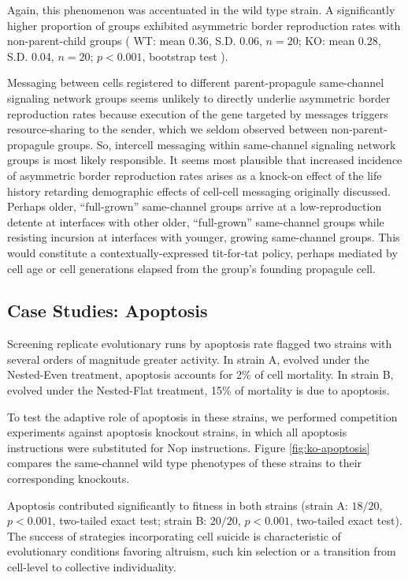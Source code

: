 Again, this phenomenon was accentuated in the wild type strain.
A significantly higher proportion of groups exhibited asymmetric border reproduction rates with non-parent-child groups
(%
WT: mean 0.36, S.D. 0.06, $n=20$;
KO: mean 0.28, S.D. 0.04, $n=20$;
$p < 0.001$, bootstrap test%
). %

Messaging between cells registered to different parent-propagule same-channel signaling network groups seems unlikely to directly underlie asymmetric border reproduction rates because execution of the gene targeted by messages triggers resource-sharing to the sender, which we seldom observed between non-parent-propagule groups.
So, intercell messaging within same-channel signaling network groups is most likely responsible.
It seems most plausible that increased incidence of asymmetric border reproduction rates arises as a knock-on effect of the life history retarding demographic effects of cell-cell messaging originally discussed.
Perhaps older, ``full-grown'' same-channel groups arrive at a low-reproduction detente at interfaces with other older, ``full-grown'' same-channel groups while resisting incursion at interfaces with younger, growing same-channel groups.
This would constitute a contextually-expressed tit-for-tat policy, perhaps mediated by cell age or cell generations elapsed from the group's founding propagule cell.

\subsection{Case Studies: Apoptosis} \label{sec:apoptosis}



Screening replicate evolutionary runs by apoptosis rate flagged two strains with several orders of magnitude greater activity.
In strain A, evolved under the Nested-Even treatment, apoptosis accounts for 2\% of cell mortality.
In strain B, evolved under the Nested-Flat treatment, 15\% of mortality is due to apoptosis.

To test the adaptive role of apoptosis in these strains, we performed competition experiments against apoptosis knockout strains, in which all apoptosis instructions were substituted for Nop instructions.
Figure \ref{fig:ko-apoptosis} compares the same-channel wild type phenotypes of these strains to their corresponding knockouts.

Apoptosis contributed significantly to fitness in both strains (strain A: $18/20$, $p < 0.001$, two-tailed exact test; strain B: $20/20$, $p < 0.001$, two-tailed exact test).
The success of strategies incorporating cell suicide is characteristic of evolutionary conditions favoring altruism, such kin selection or a transition from cell-level to collective individuality.

